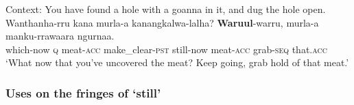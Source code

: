 \begin{exe}
	\ex \label{exappendixMartuthinura4}
	 Context: You have found a hole with a goanna in it, and dug the hole open.\\
	\gll Wanthanha-rru kana murla-a kanangkalwa-lalha? \textbf{Waruul}-warru, murla-a manku-rrawaara ngurnaa.\\
	which-now \textsc{q} meat-\textsc{acc} make\_clear-\textsc{pst} still-now meat-\textsc{acc} grab-\textsc{seq} that.\textsc{acc}\\
	\glt \lq What now that you've uncovered the meat? Keep going, grab hold of that meat.' \parencite[268]{Dench1994}
\end{exe}
\pagebreak
\subsubsection{Uses on the fringes of \lq{}still\rq{}}
